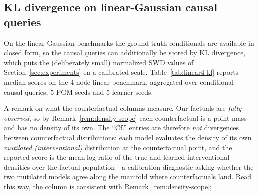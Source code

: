\subsection{KL divergence on linear-Gaussian causal queries}
\label{app:kl-linear}

On the linear-Gaussian benchmarks the ground-truth conditionals are available in closed form, so the causal queries can additionally be scored by KL divergence, which puts the (deliberately small) normalized SWD values of Section~\ref{sec:experiments} on a calibrated scale. Table~\ref{tab:linear4-kl} reports median scores on the $4$-node linear benchmark, aggregated over conditional causal queries, $5$ PGM seeds and $5$ learner seeds. 

A remark on what the counterfactual columns measure. Our factuals are \emph{fully observed}, so by Remark~\ref{rem:density-scope} each counterfactual is a point mass and has no density of its own. The ``Cf.'' entries are therefore \emph{not} divergences between counterfactual distributions: each model evaluates the density of its own \emph{mutilated (interventional)} distribution at the counterfactual point, and the reported score is the mean log-ratio of the true and learned interventional densities over the factual population---a calibration diagnostic asking whether the two mutilated models agree along the manifold where counterfactuals land. Read this way, the column is consistent with Remark~\ref{rem:density-scope}; 

